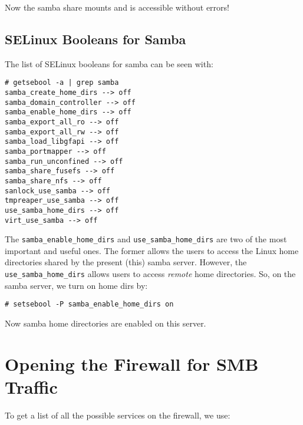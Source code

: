 \noindent
Now the samba share mounts and is accessible without errors!

\subsection{SELinux Booleans for Samba}
The list of SELinux booleans for samba can be seen with:

\vspace{-15pt}
\begin{verbatim}
# getsebool -a | grep samba
samba_create_home_dirs --> off
samba_domain_controller --> off
samba_enable_home_dirs --> off
samba_export_all_ro --> off
samba_export_all_rw --> off
samba_load_libgfapi --> off
samba_portmapper --> off
samba_run_unconfined --> off
samba_share_fusefs --> off
samba_share_nfs --> off
sanlock_use_samba --> off
tmpreaper_use_samba --> off
use_samba_home_dirs --> off
virt_use_samba --> off
\end{verbatim}
\vspace{-10pt}	

\noindent
The \verb|samba_enable_home_dirs| and \verb|use_samba_home_dirs| are two of the most important and useful ones. The former allows the users to access the Linux home directories shared by the present (this) samba server. However, the \verb|use_samba_home_dirs| allows users to access \textit{remote} home directories. So, on the samba server, we turn on home dirs by:

\vspace{-15pt}
\begin{verbatim}
# setsebool -P samba_enable_home_dirs on
\end{verbatim}
\vspace{-10pt}	

\noindent
Now samba home directories are enabled on this server. 

\section{Opening the Firewall for SMB Traffic}
To get a list of all the possible services on the firewall, we use:

